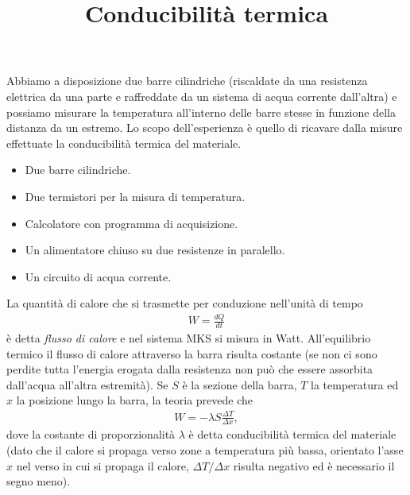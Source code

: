 \documentclass{lab1-article}
\title{Conducibilit\`a termica}
\begin{document}
\begin{article}

\maketitle

\secsummary
Abbiamo a disposizione due barre cilindriche (riscaldate da una resistenza
elettrica da una parte e raffreddate da un sistema di acqua corrente dall'altra)
e possiamo misurare la temperatura all'interno delle barre stesse in
funzione della distanza da un estremo.
Lo scopo dell'esperienza \`e quello di ricavare dalla misure effettuate
la conducibilit\`a termica del materiale.


\secmaterials

\begin{itemize}
\item Due barre cilindriche.
\item Due termistori per la misura di temperatura.
\item Calcolatore con programma di acquisizione.
\item Un alimentatore chiuso su due resistenze in paralello.
\item Un circuito di acqua corrente.
\end{itemize}


\secmeasurements

La quantit\`a di calore che si trasmette per conduzione nell'unit\`a di tempo
\begin{align}
  W = \frac{dQ}{dt}
\end{align}
\`e detta \emph{flusso di calore} e nel sistema MKS si misura in Watt.
All'equilibrio termico il flusso di calore attraverso la barra risulta costante
(se non ci sono perdite tutta l'energia erogata dalla resistenza non pu\`o che
essere assorbita dall'acqua all'altra estremit\`a). Se $S$ \`e la sezione
della barra, $T$ la temperatura ed $x$ la posizione lungo la barra, la
teoria prevede che
\begin{align}\label{eq:conduction}
  W = -\lambda S \frac{\Delta T}{\Delta x},
\end{align}
dove la costante di proporzionalit\`a $\lambda$ \`e detta conducibilit\`a
termica del materiale (dato che il calore si propaga verso zone a temperatura
pi\`u bassa, orientato l'asse $x$ nel verso in cui si propaga il calore,
$\Delta T/\Delta x$ risulta negativo ed \`e necessario il segno meno).




\end{article}
\end{document}
